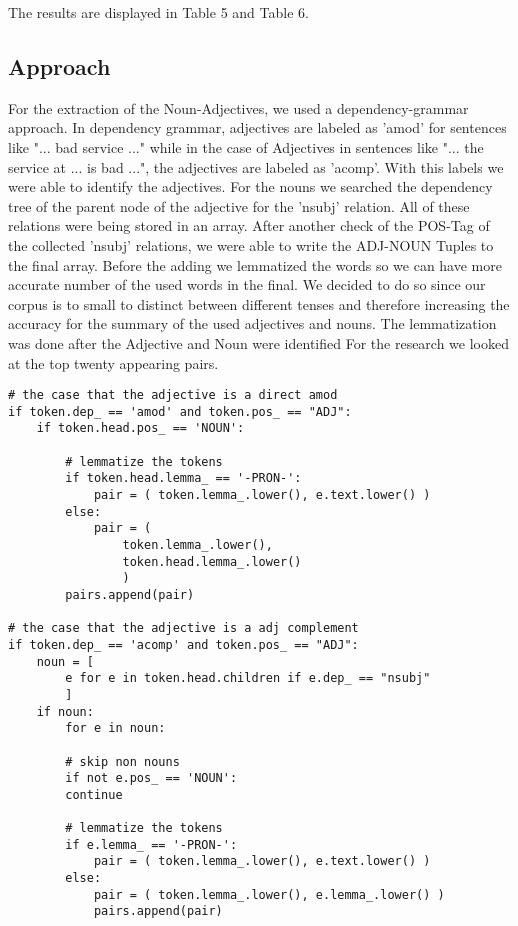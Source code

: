 The results are displayed in Table 5 and Table 6.
\subsection{Approach}
For the extraction of the Noun-Adjectives, we used a dependency-grammar approach. In dependency grammar, adjectives are labeled as 'amod' for sentences like "... bad service ..." while in the case of Adjectives in sentences like "... the service at ... is bad ...", the adjectives are labeled as 'acomp'. With this labels we were able to identify the adjectives. For the nouns we searched the dependency tree of the parent node of the adjective for 
the 'nsubj' relation. All of these relations were being stored in an array. After another check of the POS-Tag of the collected 'nsubj' relations, we were able to write the ADJ-NOUN Tuples to the final array. Before the adding we lemmatized the words so we can have more accurate number of the used words in the final. We decided to do so since our corpus is to small to distinct between different tenses and therefore increasing the accuracy for the summary of the used adjectives and nouns. The lemmatization was done after the Adjective and Noun were identified For the research we looked at the top twenty appearing pairs.\\
\begin{Verbatim}[fontsize=\tiny]
# the case that the adjective is a direct amod
if token.dep_ == 'amod' and token.pos_ == "ADJ":
	if token.head.pos_ == 'NOUN':

		# lemmatize the tokens
		if token.head.lemma_ == '-PRON-':
			pair = ( token.lemma_.lower(), e.text.lower() )
		else:
			pair = ( 
				token.lemma_.lower(), 
				token.head.lemma_.lower() 
				)
		pairs.append(pair)

# the case that the adjective is a adj complement
if token.dep_ == 'acomp' and token.pos_ == "ADJ":
	noun = [
		e for e in token.head.children if e.dep_ == "nsubj"
		]
	if noun:
		for e in noun:

		# skip non nouns
		if not e.pos_ == 'NOUN':
		continue

		# lemmatize the tokens
		if e.lemma_ == '-PRON-':
			pair = ( token.lemma_.lower(), e.text.lower() )
		else:
			pair = ( token.lemma_.lower(), e.lemma_.lower() )
			pairs.append(pair)
\end{Verbatim}
